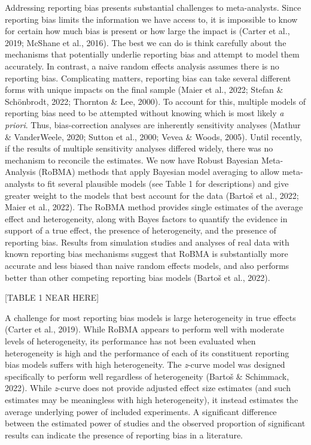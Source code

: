 \documentclass[
  man, donotrepeattitle,mask,floatsintext]{apa7}
\begin{document}
Addressing reporting bias presents substantial challenges to meta-analysts. Since reporting bias limits the information we have access to, it is impossible to know for certain how much bias is present or how large the impact is (Carter et al., 2019; McShane et al., 2016). The best we can do is think carefully about the mechanisms that potentially underlie reporting bias and attempt to model them accurately. In contrast, a naive random effects analysis assumes there is no reporting bias. Complicating matters, reporting bias can take several different forms with unique impacts on the final sample (Maier et al., 2022; Stefan \& Schönbrodt, 2022; Thornton \& Lee, 2000). To account for this, multiple models of reporting bias need to be attempted without knowing which is most likely \emph{a priori}. Thus, bias-correction analyses are inherently sensitivity analyses (Mathur \& VanderWeele, 2020; Sutton et al., 2000; Vevea \& Woods, 2005). Until recently, if the results of multiple sensitivity analyses differed widely, there was no mechanism to reconcile the estimates. We now have Robust Bayesian Meta-Analysis (RoBMA) methods that apply Bayesian model averaging to allow meta-analysts to fit several plausible models (see Table 1 for descriptions) and give greater weight to the models that best account for the data (Bartoš et al., 2022; Maier et al., 2022). The RoBMA method provides single estimates of the average effect and heterogeneity, along with Bayes factors to quantify the evidence in support of a true effect, the presence of heterogeneity, and the presence of reporting bias. Results from simulation studies and analyses of real data with known reporting bias mechanisms suggest that RoBMA is substantially more accurate and less biased than naive random effects models, and also performs better than other competing reporting bias models (Bartoš et al., 2022).

\begin{center}
[TABLE 1 NEAR HERE]
\end{center}

A challenge for most reporting bias models is large heterogeneity in true effects (Carter et al., 2019). While RoBMA appears to perform well with moderate levels of heterogeneity, its performance has not been evaluated when heterogeneity is high and the performance of each of its constituent reporting bias models suffers with high heterogeneity. The \emph{z}-curve model was designed specifically to perform well regardless of heterogeneity (Bartoš \& Schimmack, 2022). While \emph{z}-curve does not provide adjusted effect size estimates (and such estimates may be meaningless with high heterogeneity), it instead estimates the average underlying power of included experiments. A significant difference between the estimated power of studies and the observed proportion of significant results can indicate the presence of reporting bias in a literature.
\end{document}
